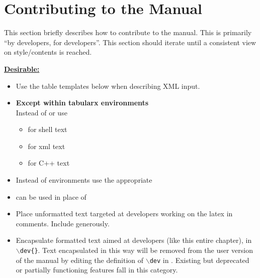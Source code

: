 
\chapter{Contributing to the Manual}
\label{chap:contrib}

This section briefly describes how to contribute to the manual.  This is primarily ``by developers, for developers''.   This section should iterate until a consistent view on style/contents is reached.

\textbf{\underline{Desirable:}}
\begin{itemize}
\item{Use the table templates below when describing XML input.}
\item{\bf{Except} within tabularx environments}\\Instead of \ilatex{\\texttt} or \ilatex{\\verb} use
    \begin{itemize}
      \item{\ilatex{\\ishell} for shell text}
      \item{\ilatex{\\ixml} for xml text}
      \item{\ilatex{\\icode} for C++ text}
      \end{itemize}
     
    \item{Instead of \ilatex{\\begin{verbatim}} environments use the appropriate }
\item{ can be used in place of }
\item{Place unformatted text targeted at developers working on the latex in comments.  Include generously.}  
\item{Encapsulate formatted text aimed at developers (like this entire chapter), in $\backslash$\texttt{dev\{\}}.  Text encapsulated in this way will be removed from the user version of the manual by editing the definition of $\backslash$\texttt{dev} in .  Existing but deprecated or partially functioning features fall in this category.}
\end{itemize}

